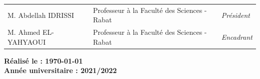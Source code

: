 \documentclass[11pt,french]{report}
\begin{document}
\begin{titlepage}
\begin{center}
\begin{tabular}{lll}

\Large{M. Abdellah IDRISSI}  &  \Large{Professeur à la Faculté des Sciences  - Rabat} & \Large{\textit{Président}}	\\[0.1cm]
\Large{M. Ahmed EL-YAHYAOUI}   &  \Large{Professeur à la Faculté des Sciences - Rabat} & \Large{\textit{Encadrant}}	\\

\end{tabular}



\vspace*{1cm}
\linespread{1.3}\huge {\bfseries Réalisé le : \today}\\[0,3cm]
\textbf{\large{Année universitaire : 2021/2022}}

\end{center}

\end{titlepage}








\newpage
\tableofcontents



\end{document}
